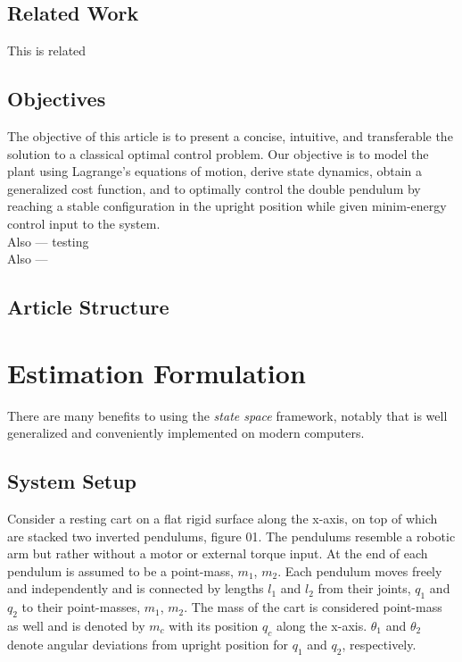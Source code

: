 \documentclass[journal]{IEEEtran}
\begin{document}
\subsection{Related Work}
This is related \\

\subsection{Objectives}
The objective of this article is to present a concise, intuitive, and transferable
the solution to a classical optimal control problem.
Our objective is to model the plant using Lagrange's equations of motion,
derive state dynamics, obtain a generalized cost function, and to optimally
control the double pendulum by reaching a stable configuration in the upright
position while given minim-energy control input to the system.\\
Also --- testing\\
Also ---\\

\subsection{Article Structure}



\section{Estimation Formulation}
There are many benefits to using the \emph{state space} framework, notably that
is well generalized and conveniently implemented on modern computers.

\subsection{System Setup}
Consider a resting cart on a flat rigid surface along the x-axis, on top of
which are stacked two inverted pendulums, figure 01. The pendulums resemble a
robotic arm but rather without a motor or external torque input. At the end of
each pendulum is assumed to be a point-mass, \(m_1\), \(m_2\). Each pendulum
moves freely and independently and is connected by lengths \(l_1\) and \(l_2\)
from their joints, \(q_1\) and \(q_2\) to their point-masses, \(m_1\),
\(m_2\). The mass of the cart is considered point-mass as well and is denoted
by \(m_c\) with its position \(q_c\) along the x-axis. \(\theta_1\) and
\(\theta_2\) denote angular deviations from upright position for \(q_1\) and
\(q_2\), respectively.
\end{document}
